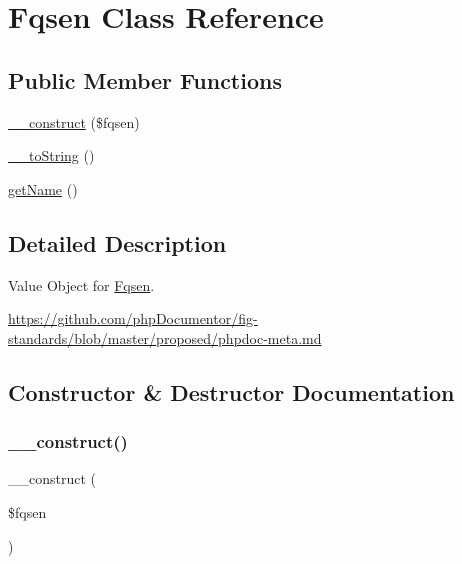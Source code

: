 \hypertarget{classphp_documentor_1_1_reflection_1_1_fqsen}{}\section{Fqsen Class Reference}
\label{classphp_documentor_1_1_reflection_1_1_fqsen}
\subsection*{Public Member Functions}
\begin{DoxyCompactItemize}
\item 
\mbox{\hyperlink{classphp_documentor_1_1_reflection_1_1_fqsen_aa3b950f11f3933abae938f3568e66ea3}{\+\_\+\+\_\+construct}} (\$fqsen)
\item 
\mbox{\hyperlink{classphp_documentor_1_1_reflection_1_1_fqsen_a7516ca30af0db3cdbf9a7739b48ce91d}{\+\_\+\+\_\+to\+String}} ()
\item 
\mbox{\hyperlink{classphp_documentor_1_1_reflection_1_1_fqsen_a3d0963e68bb313b163a73f2803c64600}{get\+Name}} ()
\end{DoxyCompactItemize}


\subsection{Detailed Description}
Value Object for \mbox{\hyperlink{classphp_documentor_1_1_reflection_1_1_fqsen}{Fqsen}}.

\mbox{\hyperlink{}{https\+://github.\+com/php\+Documentor/fig-\/standards/blob/master/proposed/phpdoc-\/meta.\+md}}

\subsection{Constructor \& Destructor Documentation}
\mbox{\label{classphp_documentor_1_1_reflection_1_1_fqsen_aa3b950f11f3933abae938f3568e66ea3}} 
\subsubsection{\texorpdfstring{\+\_\+\+\_\+construct()}{\_\_construct()}}
{\footnotesize\ttfamily \+\_\+\+\_\+construct (\begin{DoxyParamCaption}\item[{}]{\$fqsen }\end{DoxyParamCaption})}

